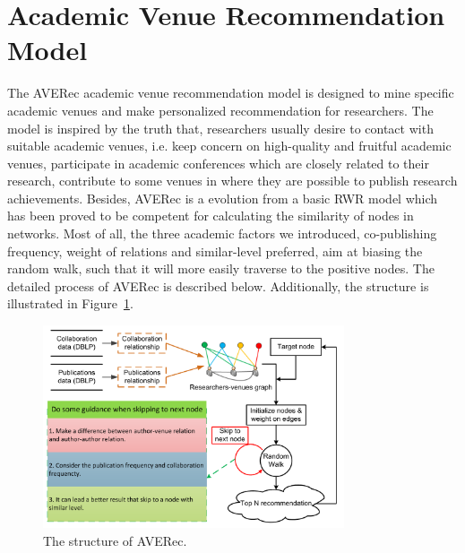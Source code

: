 \documentclass[9pt]{acm_proc_article-sp}
\begin{document}
\section{Academic Venue Recommendation Model}
The AVERec academic venue recommendation model is designed to mine specific academic venues and make personalized recommendation for researchers. The model is inspired by the truth that, researchers usually desire to contact with suitable academic venues, i.e. keep concern on high-quality and fruitful academic venues, participate in academic conferences which are closely related to their research, contribute to some venues in where they are possible to publish research achievements. Besides, AVERec is a evolution from a basic RWR model which has been proved to be competent for calculating the similarity of nodes in networks. Most of all, the three academic factors we introduced, co-publishing frequency, weight of relations and similar-level preferred, aim at biasing the random walk, such that it will more easily traverse to the positive nodes. The detailed process of AVERec is described below. Additionally, the structure is illustrated in Figure~\ref{Fig1}.
\begin{figure}[!ht]
\centering
\includegraphics [width=3.5in]{Fig1.pdf}
\caption{The structure of AVERec.}
\label{Fig1}
\end{figure}
\end{document}
